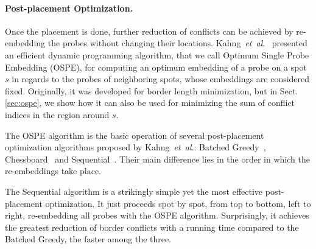 \documentclass[runningheads]{llncs}
\newcommand{\ignore}[1]{}
\begin{document}
\paragraph{Post-placement Optimization.}
Once the placement is done, further reduction of conflicts can be
achieved by re-embedding the probes without changing their locations.
Kahng~{\it et~al}.~\cite{KAHNG02} presented an efficient dynamic programming
algorithm, that we call Optimum Single Probe Embedding (OSPE), for computing an
optimum embedding of a probe on a spot $s$ in regards to the probes of
neighboring spots, whose embeddings are considered fixed.
Originally, it was developed for border length minimization, but
in Sect.\,\ref{sec:ospe}, we show how it can also be used for minimizing the
sum of conflict indices in the region around $s$.

The OSPE algorithm is the basic operation of several post-placement optimization
algorithms proposed by Kahng~{\it et~al}.: Batched Greedy~\cite{KAHNG02},
Chessboard~\cite{KAHNG02} and Sequential~\cite{KAHNG03B}. Their main difference lies in
the order in which the re-embeddings take place.

\ignore{
The first algorithm is a simple greedy approach that computes, for each spot of the chip,
the maximum reduction of conflicts that could be achieved by re-embedding its probe with
the OSPE algorithm. It then greedily selects the spot with higher gain and re-embeds
its probe optimally in regards to its neighbors, updating the gains of affected
spots. A faster version, called Batched Greedy, sacrifices its greedy nature by postponing
the update of gains and re-embedding all probes that have not been affected by the
re-embeddings performed in the current iteration.

The Chessboard optimization is based on the fact that a chip can be bi-colored
just like a chessboard, in such a way that the embeddings of probes located on
white spots, with respect to border length, are independent of those placed on black spots,
and vice-versa. The Chessboard uses this coloring to alternate the optimal re-embedding
of probes located on black and white spots.
}

The Sequential algorithm is a strikingly simple yet the most effective post-placement
optimization. It just proceeds spot by spot, from top to bottom, left to right,
re-embedding all probes with the OSPE algorithm. Surprisingly, it achieves the greatest
reduction of border conflicts with a running time compared to the Batched Greedy,
the faster among the three.
\end{document}
